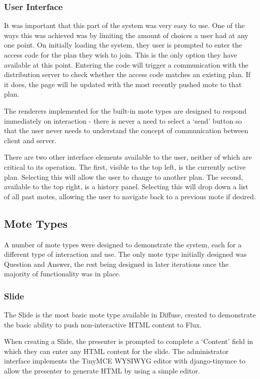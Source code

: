 \documentclass[a4papert,11pt,notitlepage]{ltxdoc}
\begin{document}
\subsubsection{User Interface}
It was important that this part of the system was very easy to use. One of the ways this was achieved was by limiting the amount of choices a user had at any one point. On initially loading the system, they user is prompted to enter the access code for the plan they wish to join. This is the only option they have available at this point. Entering the code will trigger a communication with the distribution server to check whether the access code matches an existing plan. If it does, the page will be updated with the most recently pushed mote to that plan.

The renderers implemented for the built-in mote types are designed to respond immediately on interaction - there is never a need to select a `send' button so that the user never needs to understand the concept of communication between client and server.

There are two other interface elements available to the user, neither of which are critical to its operation. The first, visible to the top left, is the currently active plan. Selecting this will allow the user to change to another plan. The second, available to the top right, is a history panel. Selecting this will drop down a list of all past motes, allowing the user to navigate back to a previous mote if desired.

\subsection{Mote Types}
A number of mote types were designed to demonstrate the system, each for a different type of interaction and use. The only mote type initially designed was Question and Answer, the rest being designed in later iterations once the majority of functionality was in place.

\subsubsection{Slide}
The Slide is the most basic mote type available in Diffuse, created to demonstrate the basic ability to push non-interactive HTML content to Flux.

When creating a Slide, the presenter is prompted to complete a `Content' field in which they can enter any HTML content for the slide. The administrator interface implements the TinyMCE\cite{tinymce:web} WYSIWYG editor with django-tinymce\cite{djangotinymce:web} to allow the presenter to generate HTML by using a simple editor.
\end{document}
